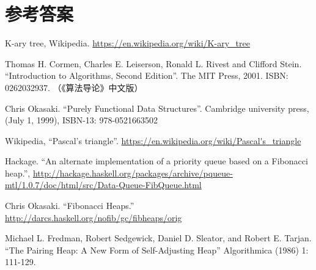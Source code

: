 \documentclass[b5paper]{ctexart}
\begin{document}
\ifx\wholebook\relax \else
\section{参考答案}
\shipoutAnswer

\begin{thebibliography}{99}

K-ary tree, Wikipedia. \url{https://en.wikipedia.org/wiki/K-ary_tree}

Thomas H. Cormen, Charles E. Leiserson, Ronald L. Rivest and Clifford Stein. ``Introduction to Algorithms, Second Edition''. The MIT Press, 2001. ISBN: 0262032937. （《算法导论》中文版）

Chris Okasaki. ``Purely Functional Data Structures''. Cambridge university press, (July 1, 1999), ISBN-13: 978-0521663502

Wikipedia, ``Pascal's triangle''. \url{https://en.wikipedia.org/wiki/Pascal's_triangle}

Hackage. ``An alternate implementation of a priority queue based on a Fibonacci heap.'', \url{http://hackage.haskell.org/packages/archive/pqueue-mtl/1.0.7/doc/html/src/Data-Queue-FibQueue.html}

Chris Okasaki. ``Fibonacci Heaps.'' \url{http://darcs.haskell.org/nofib/gc/fibheaps/orig}

Michael L. Fredman, Robert Sedgewick, Daniel D. Sleator, and Robert E. Tarjan. ``The Pairing Heap: A New Form of Self-Adjusting Heap'' Algorithmica (1986) 1: 111-129.

\end{thebibliography}

\expandafter\enddocument
\fi
\end{document}
